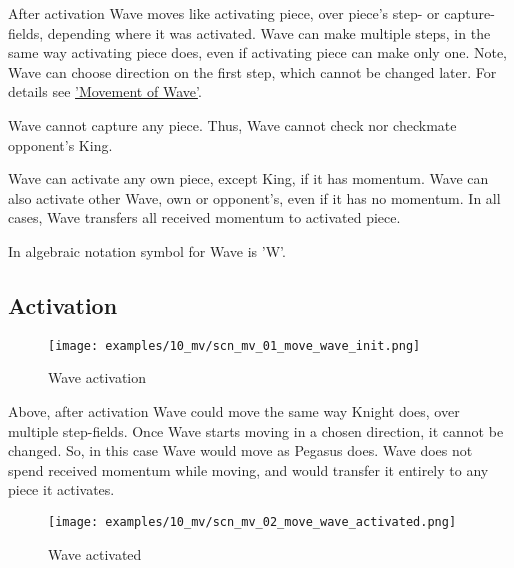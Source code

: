 After activation Wave moves like activating piece, over piece's step- or capture-
fields, depending where it was activated. Wave can make multiple steps, in the 
same way activating piece does, even if activating piece can make only one. Note, 
Wave can choose direction on the first step, which cannot be changed later. For 
details see \hyperref[sec:Definitions/Movement of Wave]{'Movement of Wave'}.

Wave cannot capture any piece. Thus, Wave cannot check nor checkmate opponent's
King.

Wave can activate any own piece, except King, if it has momentum. Wave can
also activate other Wave, own or opponent's, even if it has no momentum. In
all cases, Wave transfers all received momentum to activated piece.

In algebraic notation symbol for Wave is 'W'.

\clearpage %

\subsection*{Activation}

\vspace*{-2.0ex}
\noindent
\begin{figure}[h]
\texttt{[image: examples/10\_mv/scn\_mv\_01\_move\_wave\_init.png]}
\caption{Wave activation}
\label{fig:scn_mv_01_move_wave_init}
\end{figure}

Above, after activation Wave could move the same way Knight does, over multiple 
step-fields. Once Wave starts moving in a chosen direction, it cannot be changed.
So, in this case Wave would move as Pegasus does. Wave does not spend received
momentum while moving, and would transfer it entirely to any piece it activates.

\clearpage %

\noindent
\begin{figure}[h]
\texttt{[image: examples/10\_mv/scn\_mv\_02\_move\_wave\_activated.png]}
\caption{Wave activated}
\label{fig:scn_mv_02_move_wave_activated}
\end{figure}

